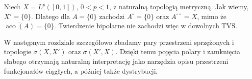\begin{przyklad}
Niech $X=L^p([0,1])$, $0<p<1$, z naturalną topologią
metryczną. Jak wiemy, $X'=\{0\}$. Dlatego dla
$A=\{0\}$ zachodzi $A^\circ=\{0\}$ oraz
$A^{\circ\circ}=X$, mimo że
$\overline{\operatorname{aco}(A)}=\{0\}$.
Twierdzenie bipolarne nie zachodzi więc w dowolnych TVS.
\end{przyklad}

\begin{uwaga}[Co dalej?]
W następnym rozdziale szczegółowo zbadamy pary
przestrzeni sprzężonych i topologie $\sigma(X,X')$ oraz
$\sigma(X',X)$. Dzięki temu pojęcia polary i
zamknięcia słabego otrzymają naturalną interpretację
jako narzędzia opisu przestrzeni funkcjonałów ciągłych,
a później także dystrybucji.
\end{uwaga}
